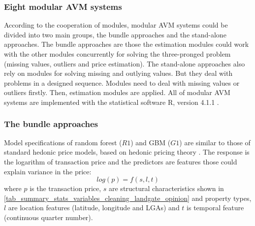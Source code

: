 %
\begin{quote}
\end{quote}
%

\subsubsection{Eight modular AVM systems}

According to the cooperation of modules, modular AVM systems could be divided into two main groups, the bundle approaches and the stand-alone approaches. The bundle approaches are those the estimation modules could work with the other modules concurrently for solving the three-pronged problem (missing values, outliers and price estimation). The stand-alone approaches also rely on modules for solving missing and outlying values. But they deal with problems in a designed sequence. Modules need to deal with missing values or outliers firstly. Then, estimation modules are applied. All of modular AVM systems are implemented with the statistical software \textsf{R}, version 4.1.1 \citep{RCT2021}.

\subsubsection*{The bundle approaches}

Model specifications of random forest ($R1$) and GBM ($G1$) are similar to those of standard hedonic price models, based on hedonic pricing theory \citep{rosen74}. The response is the logarithm of transaction price and the predictors are features those could explain variance in the price:
\begin{equation}
log(p) = f(s, l, t)
\end{equation}
where $p$ is the transaction price, $s$ are structural characteristics shown in \autoref{tab_summary_stats_variables_cleaning_landgate_opinion} and property types, $l$ are location features (latitude, longitude and LGAs) and $t$ is temporal feature (continuous quarter number). 

